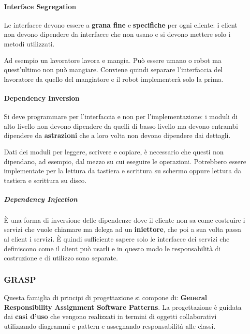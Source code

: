 \paragraph{Interface Segregation} Le interfacce devono essere a \textbf{grana fine} e \textbf{specifiche} per ogni cliente: i client non devono dipendere da interfacce che non usano e si devono mettere solo i metodi utilizzati.
\begin{example}
	Ad esempio un lavoratore lavora e mangia. Può essere umano o robot ma quest'ultimo non può mangiare. Conviene quindi separare l'interfaccia del lavoratore da quello del mangiatore e il robot implementerà solo la prima.
\end{example}

\paragraph{Dependency Inversion} Si deve programmare per l'interfaccia e non per l'implementazione: i moduli di alto livello non devono dipendere da quelli di basso livello ma devono entrambi dipendere da \textbf{astrazioni} che a loro volta non devono dipendere dai dettagli.

\begin{example}
	Dati dei moduli per leggere, scrivere e copiare, è necessario che questi non dipendano, ad esempio, dal mezzo su cui eseguire le operazioni. Potrebbero essere implementate per la lettura da tastiera e scrittura su schermo oppure lettura da tastiera e scrittura su disco.
\end{example}

\subparagraph{Dependency Injection} È una forma di inversione delle dipendenze dove il cliente non sa come costruire i servizi che vuole chiamare ma delega ad un \textbf{iniettore}, che poi a sua volta passa al client i servizi. È quindi sufficiente sapere solo le interfacce dei servizi che definiscono come il client può usarli e in questo modo le responsabilità di costruzione e di utilizzo sono separate.

\subsubsection{GRASP}
Questa famiglia di principi di progettazione si compone di: \textbf{General Responsibility Assignment Software Patterns}. La progettazione è guidata dai \textbf{casi d'uso} che vengono realizzati in termini di oggetti collaborativi utilizzando diagrammi e pattern e assegnando responsabilità alle classi.\\

